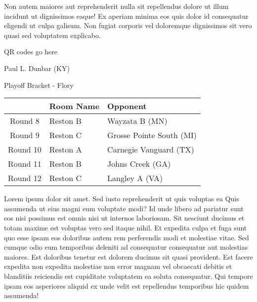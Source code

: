 \documentclass{article}%
\begin{document}
\newline%
Non autem maiores aut reprehenderit nulla sit repellendus dolore ut illum incidunt ut dignissimos eaque! Ex aperiam minima eos quis dolor id consequatur eligendi ut culpa galisum. Non fugiat corporis vel doloremque dignissimos sit vero quasi sed voluptatem explicabo.\newline%
\newline%
%
\vspace*{30pt}%
\begin{center}%
\begin{Huge}%
QR codes go here%
\end{Huge}%
\end{center}%
\newpage%
\begin{center}%
\begin{Huge}%
Paul L. Dunbar (KY)%
\end{Huge}%
\vspace*{8pt}%
\linebreak%
\begin{Large}%
Playoff Bracket {-} Flory%
\end{Large}%
\end{center}%
\begin{tabularx}{\textwidth}{|c|Y|Y|}%
\hline%
&Room Name&Opponent\\%
\hline%
Round 8&Reston B&Wayzata B (MN)\\%
Round 9&Reston C&Grosse Pointe South (MI)\\%
Round 10&Reston A&Carnegie Vanguard (TX)\\%
Round 11&Reston B&Johns Creek (GA)\\%
Round 12&Reston C&Langley A (VA)\\%
\hline%
\end{tabularx}%
\vspace*{8pt}%
\linebreak%
\newline%
\newline%
Lorem ipsum dolor sit amet. Sed iusto reprehenderit ut quis voluptas ea Quis assumenda ut eius magni eum voluptate modi? Id unde libero ad pariatur sunt eos nisi possimus est omnis nisi ut internos laboriosam. Sit nesciunt ducimus et totam maxime est voluptas vero sed itaque nihil. Et expedita culpa et fuga sunt quo esse ipsam eos doloribus autem rem perferendis modi et molestiae vitae.\newline%
\newline%
Sed cumque odio eum temporibus deleniti ad consequatur consequatur aut molestias maiores. Est doloribus tenetur est dolorem ducimus sit quasi provident. Est facere expedita non expedita molestiae non error magnam vel obcaecati debitis et blanditiis reiciendis est cupiditate voluptatem ea soluta consequatur. Qui tempore ipsam eos asperiores aliquid ex unde velit est repellendus temporibus hic quidem assumenda!\newline%
\end{document}
